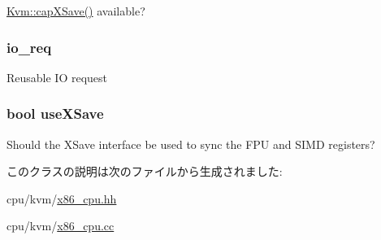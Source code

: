 \label{classX86KvmCPU_ac0fd3f6d7cf7fa1132de384a5953228c}
\hyperlink{classKvm_a9c6bbe65d43e3f2708723fc21f00b4cd}{Kvm::capXSave()} available? \hypertarget{classX86KvmCPU_ab9e917350d26247b9eb4153e891f348a}{
\subsubsection[{io\_\-req}]{ {\bf io\_\-req}}}
\label{classX86KvmCPU_ab9e917350d26247b9eb4153e891f348a}
Reusable IO request \hypertarget{classX86KvmCPU_ab966ae6cc1b380746dcb2713f2559e65}{
\subsubsection[{useXSave}]{\setlength{\rightskip}{0pt plus 5cm}bool {\bf useXSave}}}
\label{classX86KvmCPU_ab966ae6cc1b380746dcb2713f2559e65}
Should the XSave interface be used to sync the FPU and SIMD registers? 

このクラスの説明は次のファイルから生成されました:\begin{DoxyCompactItemize}
\item 
cpu/kvm/\hyperlink{x86__cpu_8hh}{x86\_\-cpu.hh}\item 
cpu/kvm/\hyperlink{x86__cpu_8cc}{x86\_\-cpu.cc}\end{DoxyCompactItemize}
